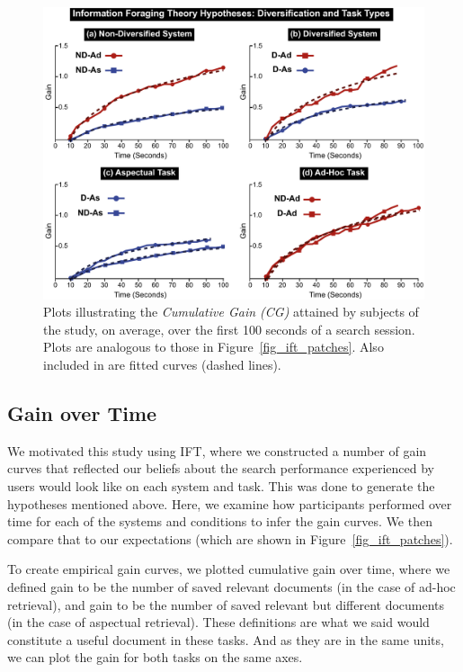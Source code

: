 \begin{figure}[t!]
\includegraphics[width=\textwidth]{figures/cg-fromthesis.pdf}
\caption{Plots illustrating the \emph{Cumulative Gain (CG)} attained by subjects of the study, on average, over the first 100 seconds of a search session. Plots are analogous to those in Figure~\ref{fig_ift_patches}. Also included in are fitted curves (dashed lines).} \label{fig_cg}
\end{figure}

\subsection{Gain over Time}
We motivated this study using IFT, where we constructed a number of gain curves that reflected our beliefs about the search performance experienced by users would look like on each system and task. This was done to generate the hypotheses mentioned above. Here, we examine how participants performed over time for each of the systems and conditions to infer the gain curves. We then compare that to our expectations (which are shown in Figure~\ref{fig_ift_patches}).

To create empirical gain curves, we plotted cumulative gain over time, where we defined gain to be the number of saved relevant documents (in the case of ad-hoc retrieval), and gain to be the number of saved relevant but different documents (in the case of aspectual retrieval). These definitions are what we said would constitute a useful document in these tasks. And as they are in the same units, we can plot the gain for both tasks on the same axes.

